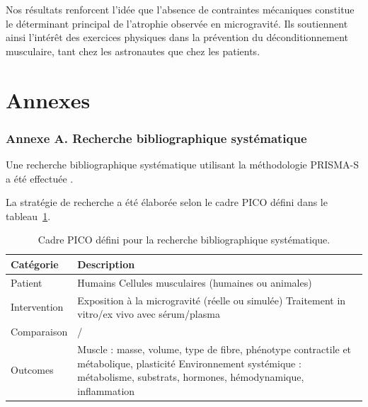 \documentclass[11pt]{report}
\begin{document}
Nos résultats renforcent l'idée que l'absence de contraintes mécaniques constitue le déterminant principal de l'atrophie observée en microgravité. Ils soutiennent ainsi l'intérêt des exercices physiques dans la prévention du déconditionnement musculaire, tant chez les astronautes que chez les patients.

\newpage
\pagestyle{empty}

\begingroup
\small %
\printbibliography
\endgroup

\clearpage

\appendix
\onehalfspacing
\normalsize

\chapter*{Annexes}
\thispagestyle{empty}

\subsection*{Annexe A. Recherche bibliographique systématique} \label{annexeA}

Une recherche bibliographique systématique utilisant la méthodologie PRISMA-S a été effectuée \parencite{Rethlefsen2021Jan,Page2021Mar}. 

La stratégie de recherche a été élaborée selon le cadre PICO défini dans le tableau~\ref{table:PICO}.

\begin{table}[ht]
	\centering
	\renewcommand{\arraystretch}{1.7}
	\begin{tabularx}{\textwidth}{
			>{\raggedright\arraybackslash}p{4cm}
			>{\raggedright\arraybackslash}X
		}
		\hline
		\textbf{Catégorie} & \textbf{Description} \\
		\hline
		Patient & Humains \newline Cellules musculaires (humaines ou animales) \\
		\hline
		Intervention & Exposition à la microgravité (réelle ou simulée) \newline Traitement in vitro/ex vivo avec sérum/plasma \\
		\hline
		Comparaison & / \\
		\hline
		Outcomes & Muscle : masse, volume, type de fibre, phénotype contractile et métabolique, plasticité \newline Environnement systémique : métabolisme, substrats, hormones, hémodynamique, inflammation \\
		\hline
	\end{tabularx}
	\caption{Cadre PICO défini pour la recherche bibliographique systématique.}
	\label{table:PICO}
\end{table}
\end{document}
